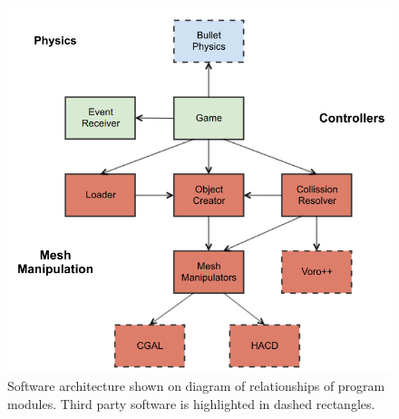 \begin{figure}
        \centering
        \includegraphics[width=\textwidth]{img/objectmodel}
        \caption{Software architecture shown on diagram of relationships of program modules. Third party software is highlighted in dashed rectangles.}
        \label{fig:modules}
\end{figure}


